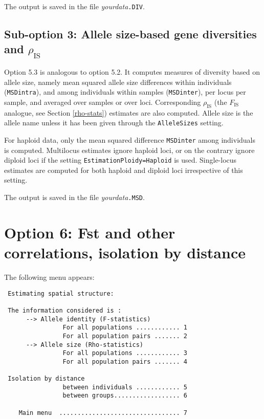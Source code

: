 \documentclass[12pt,]{book}
\theoremstyle{definition}
\theoremstyle{definition}
\theoremstyle{definition}
\theoremstyle{remark}
\begin{document}
The output is saved in the file \emph{yourdata}\texttt{.DIV}.

\subsection{\texorpdfstring{Sub-option 3: Allele size-based gene
diversities and
\(\rho_{\mathrm{IS}}\)}{Sub-option 3: Allele size-based gene diversities and \textbackslash{}rho\_\{\textbackslash{}mathrm\{IS\}\}}}\label{sub-option-3-allele-size-based-gene-diversities-and-rho_mathrmis}

Option 5.3 is analogous to option 5.2. It computes measures of diversity
based on allele size, namely mean squared allele size differences within
individuals (\texttt{MSDintra}), and among individuals within samples
(\texttt{MSDinter}), per locus per sample, and averaged over samples or
over loci. Corresponding \(\rho_\mathrm{IS}\) (the \(F_\mathrm{IS}\)
analogue, see Section \ref{rho-stats}) estimates are also computed.
Allele size is the allele name unless it has been given through the
\texttt{AlleleSizes} setting.

For haploid data, only the mean squared difference \texttt{MSDinter}
among individuals is computed. Multilocus estimates ignore haploid loci,
or on the contrary ignore diploid loci if the setting
\texttt{EstimationPloidy=Haploid} is used. Single-locus estimates are
computed for both haploid and diploid loci irrespective of this setting.

The output is saved in the file \emph{yourdata}\texttt{.MSD}.

\section{Option 6: Fst and other correlations, isolation by
distance}\label{option-6-fst-and-other-correlations-isolation-by-distance}

The following menu appears:

\begin{verbatim}
 Estimating spatial structure:

 The information considered is :
      --> Allele identity (F-statistics)
                For all populations ............ 1
                For all population pairs ....... 2
      --> Allele size (Rho-statistics)
                For all populations ............ 3
                For all population pairs ....... 4

 Isolation by distance
                between individuals ............ 5
                between groups.................. 6

    Main menu  ................................. 7
\end{verbatim}
\end{document}

